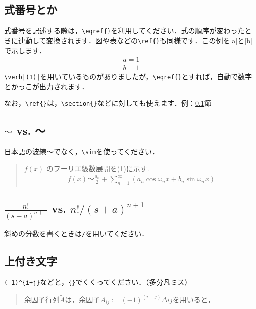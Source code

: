 \documentclass[11pt,a4paper]{jsarticle}
\begin{document}
\subsection{式番号とか}\label{sec:equation-number}

式番号を記述する際は，\verb|\eqref{}|を利用してください．式の順序が変わったときに連動して変換されます．図や表などの\verb|\ref{}|も同様です．この例を\eqref{a}と\eqref{b}で示します．
\begin{align}
  a=1\label{a} \\
  b=1\label{b}
\end{align}
\verb#\verb|(1)|#を用いているものがありましたが，\verb|\eqref{}|とすれば，自動で数字とかっこが出力されます．

なお，\verb|\ref{}|は，\verb|\section{}|などに対しても使えます．例：\ref{sec:equation-number}節

\subsection{$\sim$ vs. ～}

日本語の波線～でなく，\verb|\sim|を使ってください．

\begin{quotation}
  $f(x)$ のフーリエ級数展開を(1)に示す.
  \begin{align}
    f(x)  〜  \frac{a_0}{2} + \sum_{n=1}^{∞} (a_n\cos\omega_n x + b_n\sin\omega_n x)
  \end{align}
\end{quotation}

\subsection{$\frac{n!}{(s+a)^{n+1}}$ vs. $n!/(s+a)^{n+1}$}

斜めの分数を書くときは\verb|/|を用いてください．

\subsection{上付き文字}

\verb|(-1)^{i+j}|などと，\verb|{}|でくくってください．（多分凡ミス）

\begin{quotation}
  余因子行列$\tilde{A}$は，余因子$A_{ij}:=(-1)^(i+j)\Delta{ij}$を用いると，
\end{quotation}
\end{document}

